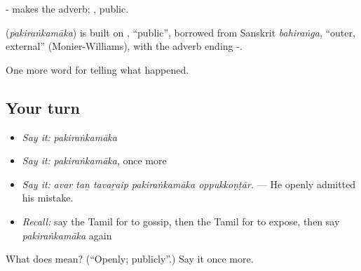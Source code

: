 - makes the adverb; , public.

\begin{cousinweb}
\textbf{} (\emph{pakiraṅkamāka}) is built on , \textquotedblleft{}public\textquotedblright{}, borrowed from Sanskrit \emph{bahiraṅga}, \textquotedblleft{}outer, external\textquotedblright{} (Monier-Williams), with the adverb ending -.
\end{cousinweb}

\begin{grammarlens}[title={What you've built}]
One more word for telling what happened.
\end{grammarlens}

\subsection*{Your turn}
\begin{itemize}
\raggedright
  \item \emph{Say it:} \emph{pakiraṅkamāka}
  \item \emph{Say it:} \emph{pakiraṅkamāka}, once more
  \item \emph{Say it:} \emph{avar taṉ tavaṟaip pakiraṅkamāka oppukkoṇṭār.} — He openly admitted his mistake.
  \item \emph{Recall:} say the Tamil for to gossip, then the Tamil for to expose, then say \emph{pakiraṅkamāka} again
\end{itemize}

\begin{tcolorbox}[breakable,colback=teal!4,colframe=teal!35!black,title={Before you move on}]
What does  mean? (\textquotedblleft{}Openly; publicly\textquotedblright{}.) Say it once more.
\end{tcolorbox}
